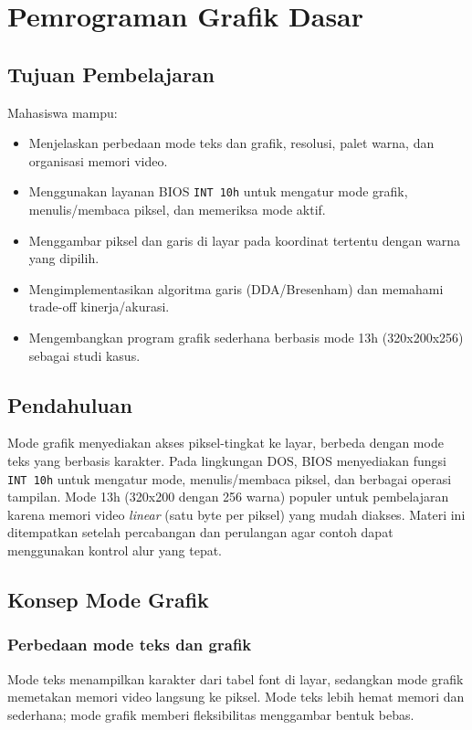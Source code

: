 \documentclass[../main.tex]{subfiles}
\begin{document}
\chapter{Pemrograman Grafik Dasar}

    \section{Tujuan Pembelajaran}
        Mahasiswa mampu:
        \begin{itemize}
            \item Menjelaskan perbedaan mode teks dan grafik, resolusi, palet warna, dan organisasi memori video.
            \item Menggunakan layanan BIOS \texttt{INT 10h} untuk mengatur mode grafik, menulis/membaca piksel, dan memeriksa mode aktif.
            \item Menggambar piksel dan garis di layar pada koordinat tertentu dengan warna yang dipilih.
            \item Mengimplementasikan algoritma garis (DDA/Bresenham) dan memahami trade-off kinerja/akurasi.
            \item Mengembangkan program grafik sederhana berbasis mode 13h (320x200x256) sebagai studi kasus.
        \end{itemize}

    \section{Pendahuluan}
        Mode grafik menyediakan akses piksel-tingkat ke layar, berbeda dengan mode teks yang berbasis karakter. Pada lingkungan DOS, BIOS menyediakan fungsi \texttt{INT 10h} untuk mengatur mode, menulis/membaca piksel, dan berbagai operasi tampilan. Mode 13h (320x200 dengan 256 warna) populer untuk pembelajaran karena memori video \textit{linear} (satu byte per piksel) yang mudah diakses. Materi ini ditempatkan setelah percabangan dan perulangan agar contoh dapat menggunakan kontrol alur yang tepat.

    \section{Konsep Mode Grafik}
        \subsection{Perbedaan mode teks dan grafik}
            Mode teks menampilkan karakter dari tabel font di layar, sedangkan mode grafik memetakan memori video langsung ke piksel. Mode teks lebih hemat memori dan sederhana; mode grafik memberi fleksibilitas menggambar bentuk bebas.
\end{document}
